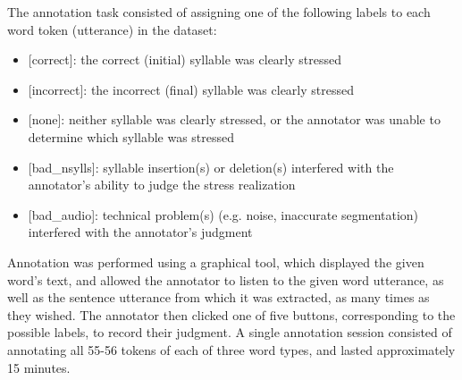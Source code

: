\documentclass[a4paper]{article}
\begin{document}
		The annotation task consisted of assigning one of the following labels to each word token (utterance) in the dataset: 
		\begin{itemize}%
	\item{[correct]: 
	the correct (initial) syllable
	was clearly stressed
	}
	\item{[incorrect]: 
	the incorrect (final) syllable
	was clearly stressed
	}
	\item{[none]: 
	neither syllable was clearly stressed, 
	or the annotator was unable to determine which syllable was stressed}
	\item{[bad\_nsylls]: 
	syllable insertion(s) or deletion(s) interfered with the annotator's ability to judge the stress realization
	}
	\item{[bad\_audio]: 
	technical problem(s)
	(e.g. noise, inaccurate segmentation) interfered with the annotator's 
	judgment
	}
	 \end{itemize}
	 
	 Annotation was performed using a graphical tool,
	 which displayed the given word's text, and allowed the annotator to listen to the given word utterance, as well as the sentence utterance from which it was extracted, as many times as they wished. 
	 {\color{blue} The annotator then clicked}
	  one of five buttons, corresponding to the possible labels, 
	  to record their judgment.
	 A single annotation session consisted of annotating all 55-56 tokens of each of three word types, and lasted approximately 15 minutes.
		
\end{document}
